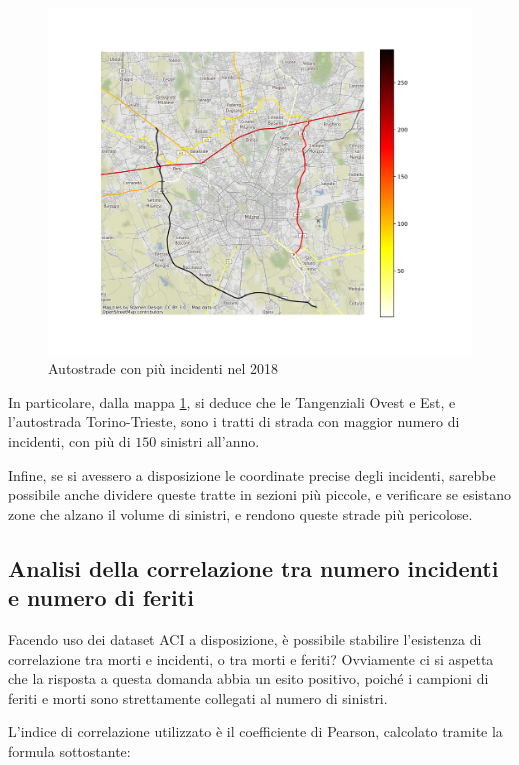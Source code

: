 \documentclass[a4paper,12pt]{report}
\begin{document}
\begin{figure}
    \includegraphics[width=\linewidth]{../src/incidenti/incidenti_aci/autostrade/incidenti_line_chart.png}
    \caption{Autostrade con più incidenti nel 2018}
    \label{fig:line-incidenti-milano}
\end{figure}

In particolare, dalla mappa \ref{fig:line-incidenti-milano}, si deduce che le 
Tangenziali Ovest e Est, e l'autostrada Torino-Trieste, sono i tratti di 
strada con maggior numero di incidenti, con più di $150$ sinistri all'anno. 

Infine, se si avessero a disposizione le coordinate precise degli incidenti, 
sarebbe possibile anche dividere queste tratte in sezioni più piccole, 
e verificare se esistano zone che alzano il volume di sinistri, e rendono queste strade 
più pericolose. 

\subsection{Analisi della correlazione tra numero incidenti e numero di feriti}

Facendo uso dei dataset ACI a disposizione, è possibile stabilire l'esistenza di 
correlazione tra morti e incidenti, o tra morti e feriti?
Ovviamente ci si aspetta che la risposta a questa domanda abbia un 
esito positivo, poiché 
i campioni di feriti e morti sono strettamente collegati al numero di sinistri. 

L'indice di correlazione utilizzato è il coefficiente di Pearson, 
calcolato tramite la formula sottostante: 
\end{document}
